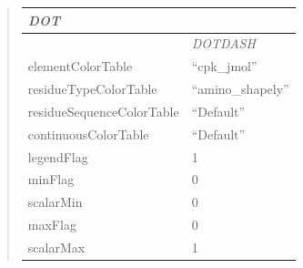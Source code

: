 \documentclass[letterpaper,10pt,english]{sphinxmanual}
\begin{document}
\begin{quote}
\begin{longtable}{|l|l|}
\emph{DOT}
\\
\hline & 
\emph{DOTDASH}
\\
\hline
elementColorTable
 & 
``cpk\_jmol''
\\
\hline
residueTypeColorTable
 & 
``amino\_shapely''
\\
\hline
residueSequenceColorTable
 & 
``Default''
\\
\hline
continuousColorTable
 & 
``Default''
\\
\hline
legendFlag
 & 
1
\\
\hline
minFlag
 & 
0
\\
\hline
scalarMin
 & 
0
\\
\hline
maxFlag
 & 
0
\\
\hline
scalarMax
 & 
1
\\
\hline\end{longtable}

\end{quote}

\begin{DUlineblock}{0em}
\item[] 
\end{DUlineblock}

\begin{DUlineblock}{0em}
\item[] 
\end{DUlineblock}
\end{document}
